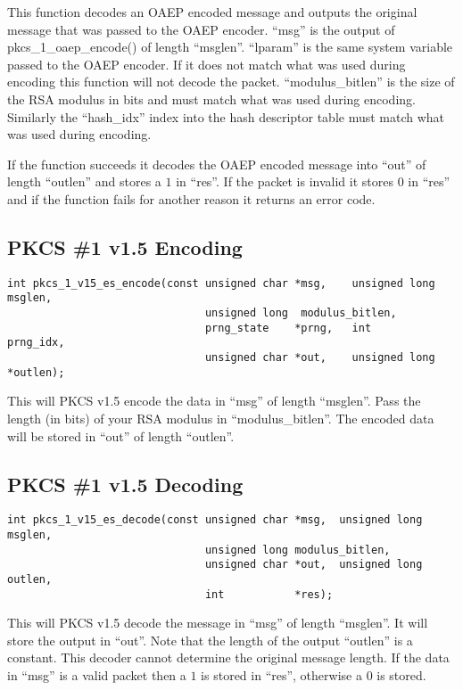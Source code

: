 \documentclass[a4paper]{book}
\begin{document}
This function decodes an OAEP encoded message and outputs the original message that was passed to the OAEP encoder.  ``msg'' is the 
output of pkcs\_1\_oaep\_encode() of length ``msglen''.  ``lparam'' is the same system variable passed to the OAEP encoder.  If it does not
match what was used during encoding this function will not decode the packet.  ``modulus\_bitlen'' is the size of the RSA modulus in bits
and must match what was used during encoding.  Similarly the ``hash\_idx'' index into the hash descriptor table must match what was used
during encoding.

If the function succeeds it decodes the OAEP encoded message into ``out'' of length ``outlen'' and stores a 
$1$ in ``res''.  If the packet is invalid it stores $0$ in ``res'' and if the function fails for another reason
it returns an error code.  

\subsection{PKCS \#1 v1.5 Encoding}

\begin{verbatim}
int pkcs_1_v15_es_encode(const unsigned char *msg,    unsigned long msglen,
                               unsigned long  modulus_bitlen, 
                               prng_state    *prng,   int           prng_idx,
                               unsigned char *out,    unsigned long *outlen);
\end{verbatim}

This will PKCS v1.5 encode the data in ``msg'' of length ``msglen''.  Pass the length (in bits) of your
RSA modulus in ``modulus\_bitlen''.  The encoded data will be stored in ``out'' of length ``outlen''.

\subsection{PKCS \#1 v1.5 Decoding}
\begin{verbatim}
int pkcs_1_v15_es_decode(const unsigned char *msg,  unsigned long msglen,
                               unsigned long modulus_bitlen,
                               unsigned char *out,  unsigned long outlen,
                               int           *res);
\end{verbatim}

This will PKCS v1.5 decode the message in ``msg'' of length ``msglen''.  It will store the output in ``out''. Note
that the length of the output ``outlen'' is a constant.  This decoder cannot determine the original message 
length.  If the data in ``msg'' is a valid packet then a $1$ is stored in ``res'', otherwise a $0$ is 
stored.
\end{document}
